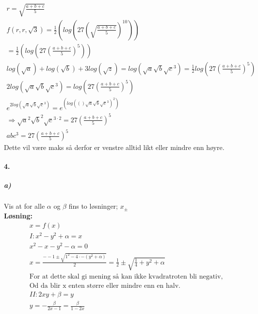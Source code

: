 \documentclass[11pt, A4paper,norsk]{article}
\begin{document}
\begin{flushleft}
\begin{align}
r = \sqrt{\frac{a + b + c}{5}} \nonumber \\
f(r, r, \sqrt{3}) = \frac{1}{2}(log(27(\sqrt{\frac{a + b + c}{5}})^10)) \nonumber \\
= \frac{1}{2}(log(27(\frac{a + b + c}{5})^5)) \nonumber \\
log(\sqrt{a}) + log(\sqrt{b}) + 3log(\sqrt{z}) = log(\sqrt{a}\sqrt{b}\sqrt{c}^3) = \frac{1}{2}log(27(\frac{a + b + c}{5})^5) \nonumber \\
2log(\sqrt{a}\sqrt{b}\sqrt{c}^3) = log(27(\frac{a + b + c}{5})^5) \nonumber \\
e^{2log(\sqrt{a}\sqrt{b}\sqrt{c}^3)} = e^{(log(()\sqrt{a}\sqrt{b}\sqrt{c}^3)^2)} \nonumber \\
\Rightarrow \sqrt{a}^2\sqrt{b}^2\sqrt{c}^{3\cdot 2} = 27(\frac{a + b + c}{5})^5 \nonumber \\
abc^3 = 27(\frac{a + b + c}{5})^5 \nonumber
				\end{align}
Dette vil være maks så derfor er venstre alltid likt eller mindre enn høyre.
			\end{flushleft}











		\paragraph{4.}
			\subparagraph{a)}
				\begin{flushleft}
Vis at for alle $\alpha$ og $\beta$ fins to løsninger; $x_{\pm}$ \\
\vspace{1mm}
\textbf{Løsning:} \\
\vspace{1mm}
					\begin{align}
x = f(x) \nonumber \\
I: x^2 - y^2 + \alpha = x \nonumber \\
x^2 - x - y^2 - \alpha = 0 \nonumber \\
x = \frac{--1 \pm \sqrt{1^2 - 4 \cdot -(y^2 + \alpha)}}{2} = \frac{1}{2} \pm \sqrt{\frac{1}{4} +y^2 + \alpha} \nonumber \\
\text{For at dette skal gi mening så kan ikke kvadratroten bli negativ,} \nonumber \\
\text{Od da blir x enten større eller mindre enn en halv.} \nonumber \\
II: 2xy + \beta = y \nonumber \\
y = -\frac{\beta}{2x - 1} = \frac{\beta}{1 - 2x} \nonumber
					\end{align}
				\end{flushleft}
\end{document}
